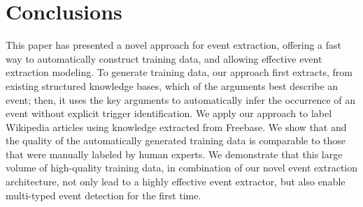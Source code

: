 \section{Conclusions}
This paper has presented a novel approach for event extraction, offering a fast way to automatically construct training data, and allowing
effective event extraction modeling.  To generate training data, our approach first extracts, from existing structured knowledge bases,
which of the arguments best describe an event; then, it uses the key arguments to automatically infer the occurrence of an event without
explicit trigger identification. We apply our approach to label Wikipedia articles using knowledge extracted from Freebase. We show that
and the quality of the automatically generated training data is comparable to those that were manually labeled by human experts.  We
demonstrate that this large volume of high-quality training data, in combination of our novel event extraction architecture,  not only lead
to a highly effective event extractor, but also enable multi-typed event detection for the first time.




%
